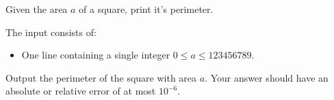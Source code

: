 \problemname{\problemyamlname}

\newcommand{\maxa}{123456789}

Given the area $a$ of a square, print it's perimeter.

\begin{Input}
	The input consists of:
	\begin{itemize}
		\item One line containing a single integer $0\leq a\leq \maxa$.
	\end{itemize}
\end{Input}

\begin{Output}
	Output the perimeter of the square with area $a$.
	Your answer should have an absolute or relative error of at most $10^{-6}$.
\end{Output}

